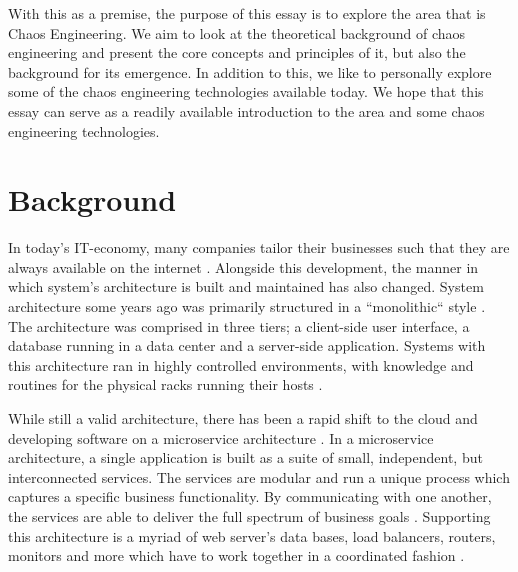 \documentclass{article}
\begin{document}
With this as a premise, the purpose of this essay is to explore the area that is Chaos Engineering. We aim to look at the theoretical background of chaos engineering and present the core concepts and principles of it, but also the background for its emergence. In addition to this, we like to personally explore some of the chaos engineering technologies available today. We hope that this essay can serve as a readily available introduction to the area and some chaos engineering technologies.

\section{Background}
In today's IT-economy, many companies tailor their businesses such that they are always available on the internet \cite{GremlinPaper}\cite{introductionToChaos}. Alongside this development, the manner in which system's architecture is built and maintained has also changed. System architecture some years ago was primarily structured in a ``monolithic`` style \cite{microserivces}\cite{introductionToChaos}. The architecture was comprised in three tiers; a client-side user interface, a database running in a data center and a server-side application. Systems with this architecture ran in highly controlled environments, with knowledge and routines for the physical racks running their hosts \cite{GremlinPaper}\cite{introductionToChaos}.

While still a valid architecture, there has been a rapid shift to the cloud and developing software on a microservice architecture \cite{GremlinPaper}. In a microservice architecture, a single application is built as a suite of small, independent, but interconnected services. The services are modular and run a unique process which captures a specific business functionality. By communicating with one another, the services are able to deliver the full spectrum of business goals \cite{microserivces}\cite{GremlinPaper}. Supporting this architecture is a myriad of web server's data bases, load balancers, routers, monitors and more which have to work together in a coordinated fashion \cite{GremlinPaper}.
\end{document}
